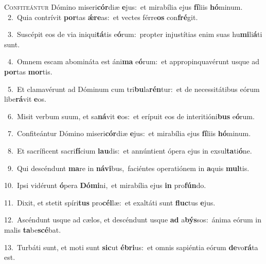 \lettrine{\initial\textcolor{\initialcolor}{C}}{onfiteántur} Dómino miseri\-\textbf{cór}\-diæ \textbf{e}\-jus:~\star et mirabília ejus \textbf{fí}\-liis \textbf{hó}\-minum.\\
{\numbfont\textcolor{\numbcolor}{~2.}}~Quia contrívit \textbf{por}\-tas \textbf{ǽ}\-\textbf{re}as:~\star et vectes férre\textbf{os} con\-\textbf{fré}\-git.\par
{\numbfont\textcolor{\numbcolor}{~3.}}~Suscépit eos de via iniqui\-\textbf{tá}\-tis e\-\textbf{ó}\-rum:~\star propter injustítias enim suas hu\-\textbf{mi}\-li\-\textbf{á}\-ti sunt.\par
{\numbfont\textcolor{\numbcolor}{~4.}}~Omnem escam abomináta est áni\textbf{ma} e\-\textbf{ó}\-rum:~\star et appropinquavérunt usque ad \textbf{por}\-tas \textbf{mor}\-tis.\par
{\numbfont\textcolor{\numbcolor}{~5.}}~Et clamavérunt ad Dóminum cum tri\-\textbf{bu}\-la\-\textbf{rén}\-tur:~\star et de necessitátibus eórum libe\-\textbf{rá}\-vit \textbf{e}\-os.\par
{\numbfont\textcolor{\numbcolor}{~6.}}~Misit verbum suum, et sa\-\textbf{ná}\-vit \textbf{e}\-os:~\star et erípuit eos de interitióni\textbf{bus} e\-\textbf{ó}\-rum.\par
{\numbfont\textcolor{\numbcolor}{~7.}}~Confiteántur Dómino miseri\-\textbf{cór}\-diæ \textbf{e}\-jus:~\star et mirabília ejus \textbf{fí}\-liis \textbf{hó}\-minum.\par
{\numbfont\textcolor{\numbcolor}{~8.}}~Et sacríficent sacri\-\textbf{fí}\-cium \textbf{lau}\-dis:~\star et annúntient ópera ejus in exsul\-\textbf{ta}\-ti\-\textbf{ó}\-ne.\par
{\numbfont\textcolor{\numbcolor}{~9.}}~Qui descéndunt \textbf{ma}\-re in \textbf{ná}\-\textbf{vi}bus,~\star faciéntes operatiónem in \textbf{a}\-quis \textbf{mul}\-tis.\par
{\numbfont\textcolor{\numbcolor}{10.}}~Ipsi vidérunt \textbf{ó}\-pera \textbf{Dó}\-\textbf{mi}ni,~\star et mirabília ejus \textbf{in} pro\-\textbf{fún}\-do.\par
{\numbfont\textcolor{\numbcolor}{11.}}~Dixit, et stetit spíri\textbf{tus} pro\-\textbf{cél}\-læ:~\star et exaltáti sunt \textbf{fluc}\-tus \textbf{e}\-jus.\par
{\numbfont\textcolor{\numbcolor}{12.}}~Ascéndunt usque ad cælos, et descéndunt usque \textbf{ad} a\-\textbf{býs}\-sos:~\star ánima eórum in malis \textbf{ta}\-be\-\textbf{scé}\-bat.\par
{\numbfont\textcolor{\numbcolor}{13.}}~Turbáti sunt, et moti sunt \textbf{sic}\-ut \textbf{é}\-\textbf{bri}us:~\star et omnis sapiéntia eórum \textbf{de}\-vo\-\textbf{rá}\-ta est.\par
